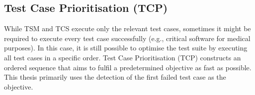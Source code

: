 \noindent{}

\subsection{Test Case Prioritisation (TCP)}
\noindent While TSM and TCS execute only the relevant test cases, sometimes it might be required to execute every test case successfully (e.g., critical software for medical purposes). In this case, it is still possible to optimise the test suite by executing all test cases in a specific order. Test Case Prioritisation (TCP) \cite{10.1002/stv.430} constructs an ordered sequence that aims to fulfil a predetermined objective as fast as possible. This thesis primarily uses the detection of the first failed test case as the objective.\\

\noindent{}